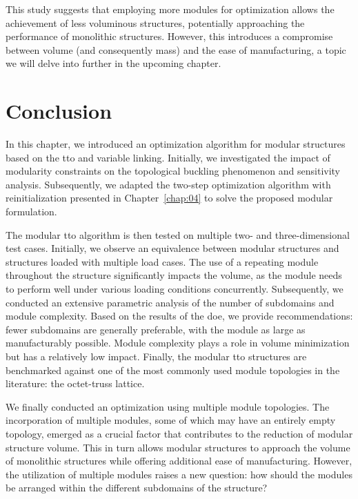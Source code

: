 This study suggests that employing more modules for optimization allows the achievement of less voluminous structures, potentially approaching the performance of monolithic structures. However, this introduces a compromise between volume (and consequently mass) and the ease of manufacturing, a topic we will delve into further in the upcoming chapter.

\section{Conclusion}
In this chapter, we introduced an optimization algorithm for modular structures based on the \acrfull{tto} and variable linking. Initially, we investigated the impact of modularity constraints on the topological buckling phenomenon and sensitivity analysis. Subsequently, we adapted the two-step optimization algorithm with reinitialization presented in Chapter~\ref{chap:04} to solve the proposed modular formulation.

The modular \gls{tto} algorithm is then tested on multiple two- and three-dimensional test cases. Initially, we observe an equivalence between modular structures and structures loaded with multiple load cases. The use of a repeating module throughout the structure significantly impacts the volume, as the module needs to perform well under various loading conditions concurrently. Subsequently, we conducted an extensive parametric analysis of the number of subdomains and module complexity. Based on the results of the \acrfull{doe}, we provide recommendations: fewer subdomains are generally preferable, with the module as large as manufacturably possible. Module complexity plays a role in volume minimization but has a relatively low impact. Finally, the modular \gls{tto} structures are benchmarked against one of the most commonly used module topologies in the literature: the octet-truss lattice.

We finally conducted an optimization using multiple module topologies. The incorporation of multiple modules, some of which may have an entirely empty topology, emerged as a crucial factor that contributes to the reduction of modular structure volume. This in turn allows modular structures to approach the volume of monolithic structures while offering additional ease of manufacturing. However, the utilization of multiple modules raises a new question: how should the modules be arranged within the different subdomains of the structure?